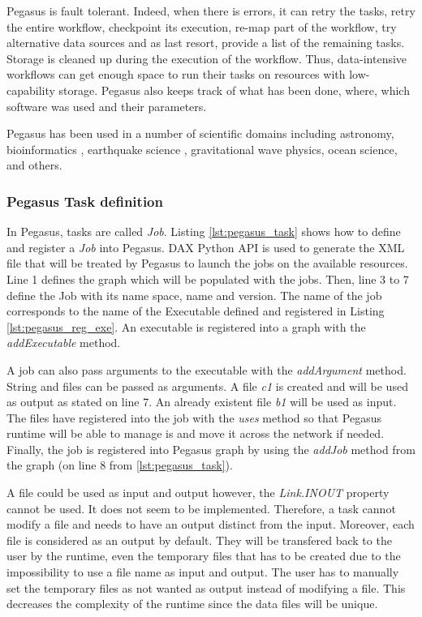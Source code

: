 Pegasus is fault tolerant.
Indeed, when there is errors, it can retry the tasks, retry the entire workflow, checkpoint its execution, re-map part of the workflow, try alternative data sources and as last resort, provide a list of the remaining tasks.
Storage is cleaned up during the execution of the workflow.
Thus, data-intensive workflows can get enough space to run their tasks on resources with low-capability storage.
Pegasus also keeps track of what has been done, where, which software was used and their parameters.

Pegasus has been used in a number of scientific domains including astronomy, bioinformatics \cite{PRBBF2016}, earthquake science , gravitational wave physics, ocean science, and others.

\subsubsection{Pegasus Task definition}
In Pegasus, tasks are called \textit{Job}.
Listing \ref{lst:pegasus_task} shows how to define and register a \textit{Job} into Pegasus.
DAX Python API is used to generate the XML file that will be treated by Pegasus to launch the jobs on the available resources.
Line 1 defines the graph which will be populated with the jobs.
Then, line 3 to 7 define the Job with its name space, name and version.
The name of the job corresponds to the name of the Executable defined and registered in Listing \ref{lst:pegasus_reg_exe}.
An executable is registered into a graph with the \textit{addExecutable} method.



A job can also pass arguments to the executable with the \textit{addArgument} method.
String and files can be passed as arguments.
A file \textit{c1} is created and will be used as output as stated on line 7.
An already existent file \textit{b1} will be used as input.
The files have registered into the job with the \textit{uses} method so that Pegasus runtime will be able to manage is and move it across the network if needed.
Finally, the job is registered into Pegasus graph by using the \textit{addJob} method from the graph (on line 8 from \ref{lst:pegasus_task}).

A file could be used as input and output however, the \textit{Link.INOUT} property cannot be used.
It does not seem to be implemented.
Therefore, a task cannot modify a file and needs to have an output distinct from the input.
Moreover, each file is considered as an output by default.
They will be transfered back to the user by the runtime, even the temporary files that has to be created due to the impossibility to use a file name as input and output.
The user has to manually set the temporary files as not wanted as output instead of modifying a file.
This decreases the complexity of the runtime since the data files will be unique.

